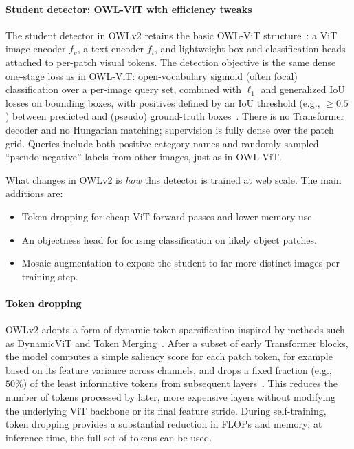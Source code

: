 \begin{enrichment}
	\begin{enrichment}
		\label{enr:chapter14_owlv2_architecture}
		
		\paragraph{Student detector: OWL-ViT with efficiency tweaks}
		The student detector in OWLv2 retains the basic OWL-ViT structure~\cite{minderer2022_owlvit}: a ViT image encoder \(f_v\), a text encoder \(f_t\), and lightweight box and classification heads attached to per-patch visual tokens.
		The detection objective is the same dense one-stage loss as in OWL-ViT: open-vocabulary sigmoid (often focal) classification over a per-image query set, combined with \(\ell_1\) and generalized IoU losses on bounding boxes, with positives defined by an IoU threshold (e.g., $\ge 0.5$) between predicted and (pseudo) ground-truth boxes~\cite{minderer2022_owlvit,minderer2024_owlvitv2}.
		There is no Transformer decoder and no Hungarian matching; supervision is fully dense over the patch grid.
		Queries include both positive category names and randomly sampled ``pseudo-negative'' labels from other images, just as in OWL-ViT.
		
		What changes in OWLv2 is \emph{how} this detector is trained at web scale.
		The main additions are:
		\begin{itemize}
			\item Token dropping for cheap ViT forward passes and lower memory use.
			\item An objectness head for focusing classification on likely object patches.
			\item Mosaic augmentation to expose the student to far more distinct images per training step.
		\end{itemize}
		
		\paragraph{Token dropping}
		OWLv2 adopts a form of dynamic token sparsification inspired by methods such as DynamicViT and Token Merging~\cite{rao2022_dynamicvit,bolya2023_tokenmerging}.
		After a subset of early Transformer blocks, the model computes a simple saliency score for each patch token, for example based on its feature variance across channels, and drops a fixed fraction (e.g., \(50\%\)) of the least informative tokens from subsequent layers~\cite{minderer2024_owlvitv2}.
		This reduces the number of tokens processed by later, more expensive layers without modifying the underlying ViT backbone or its final feature stride.
		During self-training, token dropping provides a substantial reduction in FLOPs and memory; at inference time, the full set of tokens can be used.
		

\end{enrichment}
\end{enrichment}
